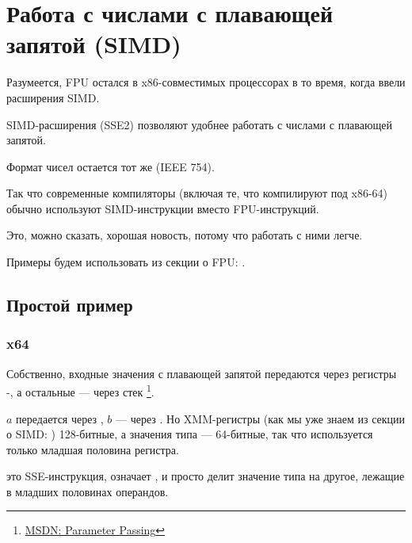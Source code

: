 \section{Работа с числами с плавающей запятой (SIMD)}

\label{floating_SIMD}
Разумеется, FPU остался в x86-совместимых процессорах в то время, когда ввели расширения \ac{SIMD}.

\ac{SIMD}-расширения (SSE2) позволяют удобнее работать с числами с плавающей запятой.

Формат чисел остается тот же (IEEE 754).

Так что современные компиляторы (включая те, что компилируют под x86-64) 
обычно используют \ac{SIMD}-инструкции вместо FPU-инструкций.

Это, можно сказать, хорошая новость, потому что работать с ними легче.

Примеры будем использовать из секции о FPU: .

\subsection{Простой пример}



\subsubsection{x64}



Собственно, входные значения с плавающей запятой передаются через регистры -, 
а остальные --- через стек
\footnote{\href{http://go.yurichev.com/17263}{MSDN: Parameter Passing}}.

$a$ передается через , $b$ --- через .
Но XMM-регистры (как мы уже знаем из секции о \ac{SIMD}: ) 128-битные, 
а значения типа \Tdouble --- 64-битные,
так что используется только младшая половина регистра.

 это SSE-инструкция, означает 
, 
и просто делит значение типа \Tdouble на другое, лежащие в младших половинах операндов.

